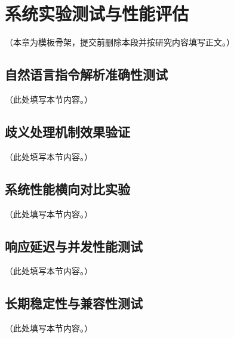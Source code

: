 
\chapter{系统实验测试与性能评估}

（本章为模板骨架，提交前删除本段并按研究内容填写正文。）

\section{自然语言指令解析准确性测试}

（此处填写本节内容。）

\section{歧义处理机制效果验证}

（此处填写本节内容。）

\section{系统性能横向对比实验}

（此处填写本节内容。）

\section{响应延迟与并发性能测试}

（此处填写本节内容。）

\section{长期稳定性与兼容性测试}

（此处填写本节内容。）
